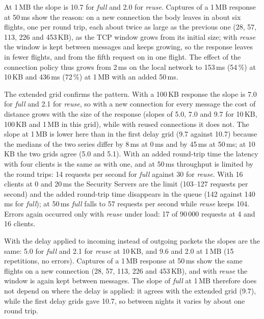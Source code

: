 \documentclass[conference,a4paper]{IEEEtran}
\begin{document}
At 1\,MB the slope is 10.7 for \emph{full} and 2.0 for \emph{reuse}.
Captures of a 1\,MB response at 50\,ms show the reason: on a new connection the body leaves in about
six flights, one per round trip, each about twice as large as the previous one (28, 57, 113, 226 and
453\,KB), as the TCP window grows from its initial size; with \emph{reuse} the window is kept between
messages and keeps growing, so the response leaves in fewer flights, and from the fifth request on
in one flight. The effect of the
connection policy thus grows from 2\,ms on the local network to 153\,ms (54\,\%) at 10\,KB and
436\,ms (72\,\%) at 1\,MB with an added 50\,ms.

The extended grid confirms the pattern. With a 100\,KB response the slope is 7.0 for \emph{full} and
2.1 for \emph{reuse}, so with a new connection for every message the cost of distance grows with the
size of the response (slopes of 5.0, 7.0 and 9.7 for 10\,KB, 100\,KB and 1\,MB in this grid), while
with reused connections it does not. The slope at 1\,MB is lower here than in the first delay grid
(9.7 against 10.7) because the medians of the two series differ by 8\,ms at 0\,ms and by 45\,ms at
50\,ms; at 10\,KB the two grids agree (5.0 and 5.1). With an added round-trip time the
latency with four clients is the same as with one, and at 50\,ms throughput is limited by the round trips: 14 requests per second for
\emph{full} against 30 for \emph{reuse}. With 16 clients at 0 and 20\,ms the Security Servers are the
limit (103--127 requests per second) and the added round-trip time disappears in the queue (142
against 140\,ms for \emph{full}); at 50\,ms \emph{full} falls to 57 requests per second while
\emph{reuse} keeps 104. Errors again occurred only with \emph{reuse} under load: 17 of 90\,000
requests at 4 and 16 clients.

With the delay applied to incoming instead of outgoing packets the slopes are the same: 5.0 for
\emph{full} and 2.1 for \emph{reuse} at 10\,KB, and 9.6 and 2.0 at 1\,MB (15 repetitions, no
errors). Captures of a 1\,MB response at 50\,ms show the same flights on a new connection (28, 57,
113, 226 and 453\,KB), and with \emph{reuse} the window is again kept between messages. The slope
of \emph{full} at 1\,MB therefore does not depend on where the delay is applied: it agrees with the
extended grid (9.7), while the first delay grids gave 10.7, so between nights it varies by about one
round trip.
\end{document}
